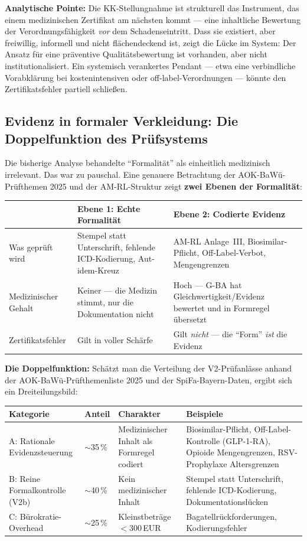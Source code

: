 \documentclass{umbruch-position}
\begin{document}
\textbf{Analytische Pointe:} Die KK-Stellungnahme ist strukturell das Instrument, das einem medizinischen Zertifikat am nächsten kommt --- eine inhaltliche Bewertung der Verordnungsfähigkeit \textit{vor} dem Schadenseintritt. Dass sie existiert, aber freiwillig, informell und nicht flächendeckend ist, zeigt die Lücke im System: Der Ansatz für eine präventive Qualitätsbewertung ist vorhanden, aber nicht institutionalisiert. Ein systemisch verankertes Pendant --- etwa eine verbindliche Vorabklärung bei kostenintensiven oder off-label-Verordnungen --- könnte den Zertifikatsfehler partiell schließen.

\subsection{Evidenz in formaler Verkleidung: Die Doppelfunktion des Prüfsystems}
\label{sec:evidenz-formale-verkleidung}

Die bisherige Analyse behandelte ``Formalität'' als einheitlich medizinisch irrelevant. Das war zu pauschal. Eine genauere Betrachtung der AOK-BaWü-Prüfthemen 2025 und der AM-RL-Struktur zeigt \textbf{zwei Ebenen der Formalität}:

\medskip
{\small
\begin{tabularx}{\textwidth}{p{2.5cm} X X}
\toprule
& \textbf{Ebene 1: Echte Formalität} & \textbf{Ebene 2: Codierte Evidenz} \\
\midrule
Was geprüft wird & Stempel statt Unterschrift, fehlende ICD-Kodierung, Aut-idem-Kreuz & AM-RL Anlage~III, Biosimilar-Pflicht, Off-Label-Verbot, Mengengrenzen \\
\addlinespace
Medizinischer Gehalt & Keiner --- die Medizin stimmt, nur die Dokumentation nicht & Hoch --- G-BA hat Gleichwertigkeit/Evidenz bewertet und in Formregel übersetzt \\
\addlinespace
Zertifikatsfehler & Gilt in voller Schärfe & Gilt \textit{nicht} --- die ``Form'' \textit{ist} die Evidenz \\
\bottomrule
\end{tabularx}
}

\medskip
\noindent\textbf{Die Doppelfunktion:} Schätzt man die Verteilung der V2-Prüfanlässe anhand der AOK-BaWü-Prüfthemenliste 2025 und der SpiFa-Bayern-Daten, ergibt sich ein Dreiteilungsbild:

\medskip
{\small
\begin{tabularx}{\textwidth}{l l p{3cm} X}
\toprule
\textbf{Kategorie} & \textbf{Anteil} & \textbf{Charakter} & \textbf{Beispiele} \\
\midrule
A: Rationale Evidenzsteuerung & ${\sim}$35\,\% & Medizinischer Inhalt als Formregel codiert & Biosimilar-Pflicht, Off-Label-Kontrolle (GLP-1-RA), Opioide Mengengrenzen, RSV-Prophylaxe Altersgrenzen \\
\addlinespace
B: Reine Formalkontrolle (V2b) & ${\sim}$40\,\% & Kein medizinischer Inhalt & Stempel statt Unterschrift, fehlende ICD-Kodierung, Dokumentationslücken \\
\addlinespace
C: Bürokratie-Overhead & ${\sim}$25\,\% & Kleinstbeträge ${<}$300\,EUR & Bagatellrückforderungen, Kodierungsfehler \\
\bottomrule
\end{tabularx}
}
\end{document}
